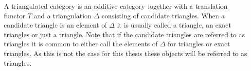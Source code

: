 \documentclass[11pt]{article}
\theoremstyle{definition}
\theoremstyle{remark}
\begin{document}
            \begin{center}
            \end{center}

            A triangulated category is an additive category together with a translation functor $T$ and a triangulation $\Delta$ consisting of candidate triangles. When a candidate triangle is an element of $\Delta$ it is usually called a  triangle, an exact triangles or just a triangle. Note that if the candidate triangles are referred to as triangles it is common to either call the elements of $\Delta$ for  triangles or exact triangles. As this is not the case for this thesis these objects will be referred to as triangles.
\end{document}
